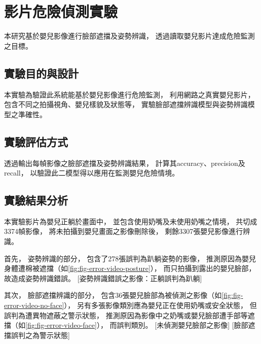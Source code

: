 \documentclass[class=NCU_thesis, crop=false]{standalone}
\begin{document}
\section{影片危險偵測實驗}
本研究基於嬰兒影像進行臉部遮擋及姿勢辨識，
透過讀取嬰兒影片達成危險監測之目標。

\subsection{實驗目的與設計}
本實驗為驗證此系統能基於嬰兒影像進行危險監測，
利用網路之真實嬰兒影片，
包含不同之拍攝視角、嬰兒樣貌及狀態等，
實驗臉部遮擋辨識模型與姿勢辨識模型之準確性。

\subsection{實驗評估方式}
透過輸出每幀影像之臉部遮擋及姿勢辨識結果，
計算其accuracy、precision及recall，
以驗證此二模型得以應用在監測嬰兒危險情境。

\subsection{實驗結果分析}
本實驗影片為嬰兒正躺於畫面中，
並包含使用奶嘴及未使用奶嘴之情境，
共切成3374幀影像，
將未拍攝到嬰兒畫面之影像刪除後，
剩餘3307張嬰兒影像進行辨識。

首先，
姿勢辨識的部分，
包含了278張誤判為趴躺姿勢的影像，
推測原因為嬰兒身體遭棉被遮擋（如\cref{fig:fig-error-video-posture}），
而只拍攝到露出的嬰兒臉部，
故造成姿勢辨識錯誤。
[姿勢辨識錯誤之影像：正躺誤判為趴躺]

其次，
臉部遮擋辨識的部分，
包含36張嬰兒臉部為被偵測之影像（如\cref{fig:fig-error-video-no-face}），
另有多張影像類別應為嬰兒正在使用奶嘴或安全狀態，
但誤判為遭異物遮蔽之警示狀態，
推測原因為影像中之奶嘴或嬰兒臉部遭手部等遮擋（如\cref{fig:fig-error-video-face}），
而誤判類別。
[未偵測嬰兒臉部之影像]
[臉部遮擋誤判之為警示狀態]
\end{document}
